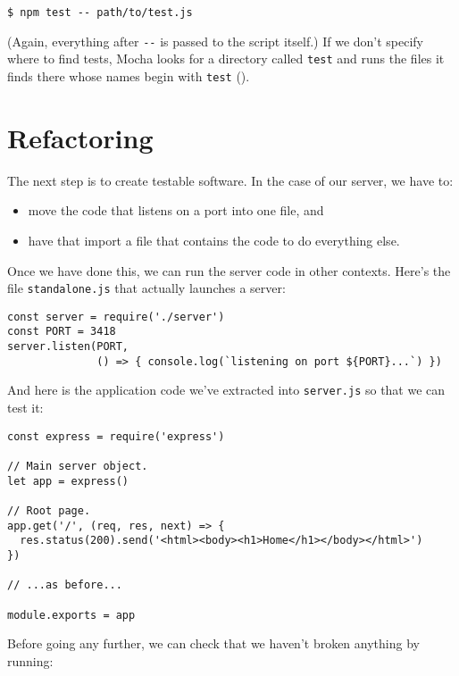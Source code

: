 \begin{verbatim}
$ npm test -- path/to/test.js
\end{verbatim}

\noindent
(Again, everything after \texttt{-\/-} is passed to the script itself.)
If we don't specify where to find tests,
Mocha looks for a directory called \texttt{test}
and runs the files it finds there whose names begin with \texttt{test}
().


\section{Refactoring}\label{s:testing-refactoring}

The next step is to create testable software.
In the case of our server,
we have to:

\begin{itemize}
\item
  move the code that listens on a port into one file, and
\item
  have that import a file that contains the code to do everything else.
\end{itemize}

Once we have done this,
we can run the server code in other contexts.
Here's the file \texttt{standalone.js} that actually launches a server:

\begin{verbatim}
const server = require('./server')
const PORT = 3418
server.listen(PORT,
              () => { console.log(`listening on port ${PORT}...`) })
\end{verbatim}

\noindent
And here is the application code we've extracted into \texttt{server.js}
so that we can test it:

\begin{verbatim}
const express = require('express')

// Main server object.
let app = express()

// Root page.
app.get('/', (req, res, next) => {
  res.status(200).send('<html><body><h1>Home</h1></body></html>')
})

// ...as before...

module.exports = app
\end{verbatim}

Before going any further,
we can check that we haven't broken anything by running:

